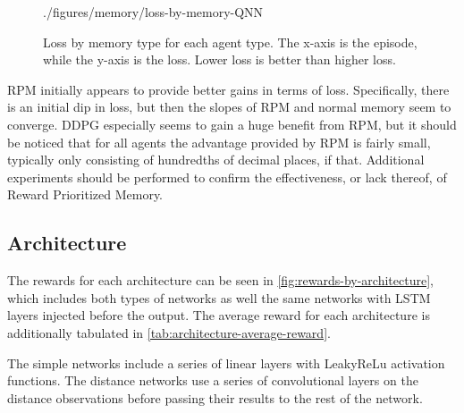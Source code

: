 \begin{figure}[!ht]
    {./figures/memory/loss-by-memory-QNN}
    \caption{
        Loss by memory type for each agent type.
        The x-axis is the episode, while the y-axis is the loss.
        Lower loss is better than higher loss.
    }
    \label{fig:loss-by-memory}
\end{figure}

RPM initially appears to provide better gains in terms of loss.
Specifically, there is an initial dip in loss, but then the slopes of RPM and normal
memory seem to converge.
DDPG especially seems to gain a huge benefit from RPM, but it should be noticed that
for all agents the advantage provided by RPM is fairly small, typically only
consisting of hundredths of decimal places, if that.
Additional experiments should be performed to confirm the effectiveness, or lack
thereof, of Reward Prioritized Memory.

\subsection{Architecture}\label{subsec:architecture}
The rewards for each architecture can be seen in
\autoref{fig:rewards-by-architecture}, which includes both types of networks as well
the same networks with LSTM layers injected before the output.
The average reward for each architecture is additionally tabulated in
\autoref{tab:architecture-average-reward}.

The simple networks include a series of linear layers with LeakyReLu activation
functions.
The distance networks use a series of convolutional layers on the distance
observations before passing their results to the rest of the network.

